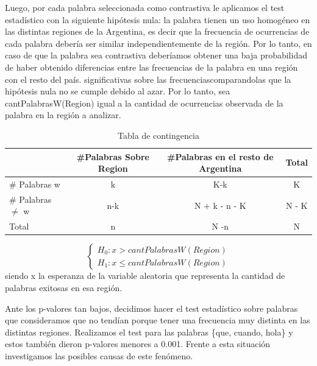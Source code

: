 Luego, por cada palabra seleccionada como contrastiva le aplicamos el test estadístico con la siguiente hipótesis nula: la palabra tienen un uso homogéneo en las distintas regiones de la Argentina, es decir que la frecuencia de ocurrencias de cada palabra debería ser similar independientemente de la región.
Por lo tanto, en caso de que la palabra sea contrastiva deberíamos obtener una baja probabilidad de haber obtenido diferencias entre las frecuencias de la palabra en una región con el resto del país.  significativas sobre las frecuenciascomparandolas que la hipótesis nula no se cumple debido al azar.
Por lo tanto, sea  cantPalabrasW(Region) igual a la cantidad de ocurrencias observada de la palabra en la región a analizar.


\begin{table}[ht]
\centering
\label{tab:contingencia}
\begin{tabular}{lccc}
\hline
& \#Palabras Sobre Region &\#Palabras en el resto de Argentina &Total \\ \hline
\# Palabras w &   k & K-k & K \\ 
\# Palabras $\neq$ w & n-k & N + k - n - K  & N - K \\ 
Total & n & N -n & N \\ \hline
\end{tabular}
\caption{Tabla de contingencia}

\end{table}



$$
\begin{cases}
H_0 :  x > cantPalabrasW(Region) \\
H_1 : x \leq cantPalabrasW(Region)
\end{cases}
$$  
siendo x la esperanza de la variable aleatoria que representa la cantidad de palabras exitosas en esa región.

Ante los p-valores tan bajos, decidimos hacer el test estadístico sobre palabras que consideramos que no tendían porque tener una frecuencia muy distinta en las distintas regiones. Realizamos el test para las palabras \{que, cuando, hola\} y estos también dieron p-valores menores a 0.001. Frente a esta situación investigamos las posibles causas de este fenómeno.

